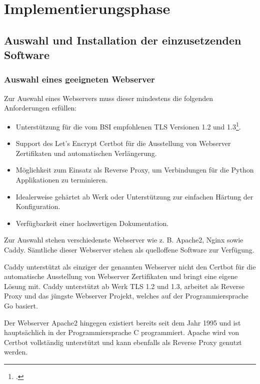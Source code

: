 \section{Implementierungsphase}

\subsection{Auswahl und Installation der einzusetzenden Software}

\subsubsection{Auswahl eines geeigneten Webserver}

Zur Auswahl eines Webservers muss dieser mindestens die folgenden Anforderungen erfüllen:

\begin{itemize}
    \item Unterstützung für die vom \ac{BSI} empfohlenen \ac{TLS} Versionen 1.2 und 1.3\footcite[Vgl.][S. 6 ff., S. 13 ff.]{bsi}.
    \item Support des Let's Encrypt Certbot für die Ausstellung von Webserver Zertifikaten und automatischen Verlängerung.
    \item Möglichkeit zum Einsatz als Reverse Proxy, um Verbindungen für die Python Applikationen zu terminieren.
    \item Idealerweise gehärtet ab Werk oder Unterstützung zur einfachen Härtung der Konfiguration.
    \item Verfügbarkeit einer hochwertigen Dokumentation.
\end{itemize}

Zur Auswahl stehen verschiedenste Webserver wie z. B. Apache2, Nginx sowie Caddy. Sämtliche dieser Webserver stehen als quelloffene Software zur Verfügung.

Caddy unterstützt als einziger der genannten Webserver nicht den Certbot für die automatische Ausstellung von Webserver Zertifikaten und bringt eine eigene Lösung mit. Caddy unterstützt ab Werk \ac{TLS} 1.2 und 1.3, arbeitet als Reverse Proxy und das jüngste Webserver Projekt, welches auf der Programmiersprache Go basiert.

Der Webserver Apache2 hingegen existiert bereits seit dem Jahr 1995 und ist hauptsächlich in der Programmiersprache C programmiert. Apache wird von Certbot vollständig unterstützt und kann ebenfalls als Reverse Proxy genutzt werden.

